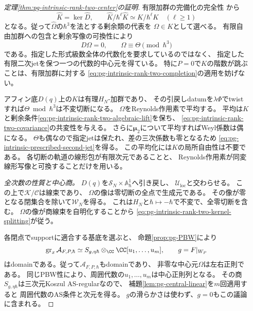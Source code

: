\begin{proof}[定理\ref{thm:pg-intrinsic-rank-two-center}の証明]
有限加群の完備化の完全性
\cite[Lemmas~10.97.1--10.97.2, Tags~00MA--00MB]{PStacks}から
\begin{equation}
 \widehat K=\ker\widehat D,\qquad
 \widehat K/\hbar^\ell\widehat K\simeq K/\hbar^\ell K\quad(\ell\ge1)
 \label{eq:pg-intrinsic-rank-two-completion}
\end{equation}
となる。従って$\widehat\Omega$の$\hbar^3$を法とする剰余類の代表を
$\Omega\in K$として選べる。
有限自由加群への包含と剰余写像の可換性により
\begin{equation}
 D\Omega=0,\qquad \Omega\equiv\Theta\pmod{\hbar^3}
 \label{eq:pg-intrinsic-rank-two-algebraic-lift}
\end{equation}
である。指定した形式級数全体の代数化を要求しているのではなく、
指定した有限二次jetを保つ一つの代数的中心元を得ている。
特に$P=0$で$K$の階数が跳ぶことは、有限加群に対する
\eqref{eq:pg-intrinsic-rank-two-completion}の適用を妨げない。

アフィン底$D(q)$上の$K$は有理$H_N$-加群であり、
その引戻しdatumを$\lambda\Phi$でtwistすれば$\Theta\bmod\hbar^3$は不変切断になる。
$\Omega$をReynolds作用素で平均する。
平均は$K$と剰余条件\eqref{eq:pg-intrinsic-rank-two-algebraic-lift}を保ち、
\eqref{eq:pg-intrinsic-rank-two-covariance}の共変性を与える。
さらに$\boldsymbol\mu_2$について平均すればWeyl係数は偶になる。
$\Theta$も偶なので指定jetは保たれ、差の三次係数も零となるため
\eqref{eq:pg-intrinsic-prescribed-second-jet}を得る。
この平均化には$K$の局所自由性は不要である。
各切断の軌道の線形包が有限次元であることと、
Reynolds作用素が同変線形写像と可換することだけを用いる。

\emph{全次数の性質と中心商。}
$D(q)$を$\mathcal S_N\times\mathbb A^1_\hbar$へ引き戻し、
$\mathcal U_{\mathrm{loc}}$と交わらせる。
この上で$\mathcal K/\mathcal C$は線束であり、
$\Omega$の像は零切断の全点で生成元である。
その像が零となる閉集合を除いて$\mathcal W_N$を得る。
これは$H_N$と$\hbar\mapsto-\hbar$で不変で、全零切断を含む。
$\Omega$の像が商線束を自明化することから
\eqref{eq:pg-intrinsic-rank-two-kernel-splitting}が従う。

各閉点でsupportに適合する基底を選ぶと、
命題\ref{prop:pg-PBW}により
\begin{equation}
 \operatorname{gr}_x\mathcal A_{F,P,\hbar}
   \simeq S_{g,\eta\hbar}\otimes_\CC\CC[u_1,\ldots,u_m],
 \qquad g=F|_{W_P}
 \label{eq:pg-intrinsic-rank-two-fiber-domain}
\end{equation}
はdomainである。従って$\mathcal A_{F,P,\hbar}$もdomainであり、
非零な中心元$\Omega$は左右正則である。
同じPBW性により、周囲代数の$u_1,\ldots,u_m$は中心正則列となる。
その商$S_{g,\eta\hbar}$は三次元Koszul AS-regularなので、
補題\ref{lem:pg-central-linear}を$m$回適用すると
周囲代数のAS条件と次元を得る。
$g$の滑らかさは使わず、$g=0$もこの議論に含まれる。


\end{proof}
